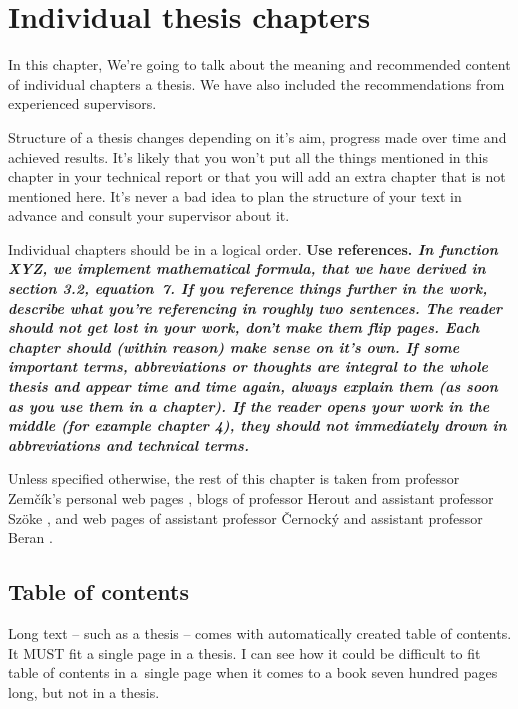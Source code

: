 \rm


\chapter{Individual thesis chapters}
\label{kapitoly}

In this chapter, We're going to talk about the meaning and recommended content of individual chapters a thesis. We have also included the recommendations from experienced supervisors. 

Structure of a thesis changes depending on it's aim, progress made over time and achieved results. It's likely that you won't put all the things mentioned in this chapter in your technical report or that you will add an extra chapter that is not mentioned here. It's never a bad idea to plan the structure of your text in advance and consult your supervisor about it.

Individual chapters should be in a logical order. \bf Use references. \rm \it In function XYZ, we implement mathematical formula, that we have derived in section 3.2, equation~7. \rm If you reference things further in the work, describe what you're referencing in roughly two sentences. The reader should not get lost in your work, don't make them flip pages. \bf Each chapter should (within reason) make sense on it's own. \rm If some important terms, abbreviations or thoughts are integral to the whole thesis and appear time and time again, always explain them (as soon as you use them in a chapter). If the reader opens your work in the middle (for example chapter 4), they should not immediately drown in abbreviations and technical terms.\cite{rady}

Unless specified otherwise, the rest of this chapter is taken from professor Zemčík's personal web pages \cite{Zemcik}, blogs of professor Herout \cite{Herout} and assistant professor Szöke \cite{rady}, and web pages of assistant professor Černocký \cite{Cernocky} and assistant professor Beran \cite{Beran}.

\section{Table of contents}
\label{obsah}

Long text -- such as a thesis -- comes with automatically created table of contents. It MUST fit a single page in a thesis. I can see how it could be difficult to fit table of contents in a~single page when it comes to a book seven hundred pages long, but not in a thesis.

